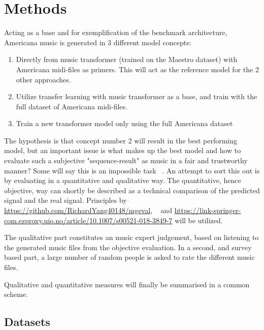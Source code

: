 \documentclass{article}
\begin{document}
    \section{Methods}

        Acting as a base and for exemplification of the benchmark architecture,
        Americana music is generated in 3 different model concepts:
        \begin{enumerate}
            \item Directly from music transformer (trained on the Maestro dataset)
                    with Americana midi-files as primers.
                    This will act as the reference model for the 2 other approaches.
            \item Utilize transfer learning with music transformer as a base, and
                    train with the full dataset of Americana midi-files.
            \item Train a new transformer model only using the full Americana dataset
        \end{enumerate} 
        
        The hypothesis is that concept number 2 will result in the best performing model,
        but an important issue is what makes up the best model and how to evaluate such a
        subjective "sequence-result" as music in a fair and trustworthy manner?
        Some will say this is an impossible task ~\cite{1030094}.
        An attempt to sort this out is by evaluating in a quantitative and qualitative way.
        The quantitative, hence objective, way can shortly be described as a technical
        comparison of the predicted signal and the real signal. Principles by
        \url{https://github.com/RichardYang40148/mgeval}, ~\cite{wu2020jazz} and
        \url{https://link-springer-com.ezproxy.uio.no/article/10.1007/s00521-018-3849-7} will be utilized.
        
        The qualitative part constitutes an music expert judgement,
        based on listening to the generated music files from the objective evaluation.
        In a second, and survey based part, a large number of random people is asked
        to rate the different music files.
        
        Qualitative and quantitative measures will finally be summarised in a common scheme.
        
    \subsection{Datasets}
\end{document}

